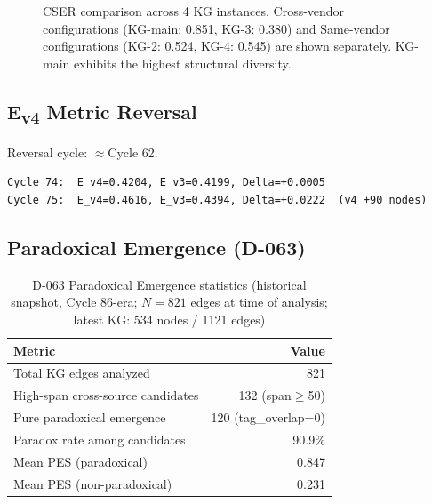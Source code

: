 \documentclass[12pt]{article}
\begin{document}
\begin{figure}[htbp]
\centering
{}
\caption{CSER comparison across 4 KG instances. Cross-vendor configurations (KG-main: 0.851, KG-3: 0.380) and Same-vendor configurations (KG-2: 0.524, KG-4: 0.545) are shown separately. KG-main exhibits the highest structural diversity.}
\label{fig:cser-kg-compare}
\end{figure}

\subsection{E\textsubscript{v4} Metric Reversal}

Reversal cycle: $\approx$Cycle 62.
\begin{lstlisting}
Cycle 74:  E_v4=0.4204, E_v3=0.4199, Delta=+0.0005
Cycle 75:  E_v4=0.4616, E_v3=0.4394, Delta=+0.0222  (v4 +90 nodes)
\end{lstlisting}

\subsection{Paradoxical Emergence (D-063)}
\label{sec:d063}

\begin{table}[h!]\centering\small
\begin{tabular}{lr}
\toprule
Metric & Value \\
\midrule
Total KG edges analyzed & 821 \\
High-span cross-source candidates & 132 (span$\geq$50) \\
Pure paradoxical emergence & 120 (tag\_overlap=0) \\
Paradox rate among candidates & 90.9\% \\
Mean PES (paradoxical) & 0.847 \\
Mean PES (non-paradoxical) & 0.231 \\
\bottomrule
\end{tabular}
\caption{D-063 Paradoxical Emergence statistics (historical snapshot, Cycle 86-era; $N=821$ edges at time of analysis; latest KG: 534 nodes / 1121 edges)}
\end{table}
\end{document}

